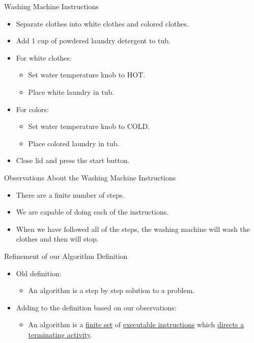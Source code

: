 \documentclass[graphics]{beamer}
\begin{document}
\begin{frame}{Washing Machine Instructions}
    \begin{itemize}
        \item Separate clothes into white clothes and colored clothes.
        \item Add 1 cup of powdered laundry detergent to tub.
        \item For white clothes:
        \begin{itemize}
            \item Set water temperature knob to HOT.
            \item Place white laundry in tub.
        \end{itemize}
        \item For colors:
        \begin{itemize}
            \item Set water temperature knob to COLD.
            \item Place colored laundry in tub.
        \end{itemize}
        \item Close lid and press the start button.
    \end{itemize}
\end{frame}

\begin{frame}{Observations About the Washing Machine Instructions}
    \begin{itemize}
        \item There are a finite number of steps.
        \item We are capable of doing each of the instructions.
        \item When we have followed all of the steps, the washing machine will wash the clothes and then will stop.
    \end{itemize}
\end{frame}

\begin{frame}{Refinement of our Algorithm Definition}
    \begin{itemize}
        \item Old definition:
        \begin{itemize}
            \item An algorithm is a step by step solution to a problem.
        \end{itemize}
        \item Adding to the definition based on our observations:
        \begin{itemize}
            \item An algorithm is a \underline{finite set} of \underline{executable instructions} which \underline{directs a terminating activity}.
        \end{itemize}
    \end{itemize}
\end{frame}
\end{document}
